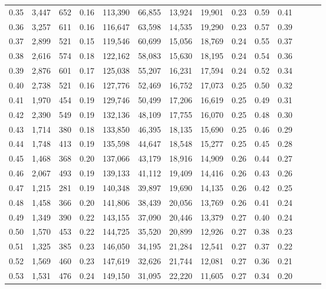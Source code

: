 \begin{tabular}{rrrrrrrrrrrrrr}
0.35 &  3,447 &  652 &  0.16 &  113,390 &   66,855 &  13,924 &  19,901 &  0.23 &  0.59 &      0.41 \\
0.36 &  3,257 &  611 &  0.16 &  116,647 &   63,598 &  14,535 &  19,290 &  0.23 &  0.57 &      0.39 \\
0.37 &  2,899 &  521 &  0.15 &  119,546 &   60,699 &  15,056 &  18,769 &  0.24 &  0.55 &      0.37 \\
0.38 &  2,616 &  574 &  0.18 &  122,162 &   58,083 &  15,630 &  18,195 &  0.24 &  0.54 &      0.36 \\
0.39 &  2,876 &  601 &  0.17 &  125,038 &   55,207 &  16,231 &  17,594 &  0.24 &  0.52 &      0.34 \\
0.40 &  2,738 &  521 &  0.16 &  127,776 &   52,469 &  16,752 &  17,073 &  0.25 &  0.50 &      0.32 \\
0.41 &  1,970 &  454 &  0.19 &  129,746 &   50,499 &  17,206 &  16,619 &  0.25 &  0.49 &      0.31 \\
0.42 &  2,390 &  549 &  0.19 &  132,136 &   48,109 &  17,755 &  16,070 &  0.25 &  0.48 &      0.30 \\
0.43 &  1,714 &  380 &  0.18 &  133,850 &   46,395 &  18,135 &  15,690 &  0.25 &  0.46 &      0.29 \\
0.44 &  1,748 &  413 &  0.19 &  135,598 &   44,647 &  18,548 &  15,277 &  0.25 &  0.45 &      0.28 \\
0.45 &  1,468 &  368 &  0.20 &  137,066 &   43,179 &  18,916 &  14,909 &  0.26 &  0.44 &      0.27 \\
0.46 &  2,067 &  493 &  0.19 &  139,133 &   41,112 &  19,409 &  14,416 &  0.26 &  0.43 &      0.26 \\
0.47 &  1,215 &  281 &  0.19 &  140,348 &   39,897 &  19,690 &  14,135 &  0.26 &  0.42 &      0.25 \\
0.48 &  1,458 &  366 &  0.20 &  141,806 &   38,439 &  20,056 &  13,769 &  0.26 &  0.41 &      0.24 \\
0.49 &  1,349 &  390 &  0.22 &  143,155 &   37,090 &  20,446 &  13,379 &  0.27 &  0.40 &      0.24 \\
0.50 &  1,570 &  453 &  0.22 &  144,725 &   35,520 &  20,899 &  12,926 &  0.27 &  0.38 &      0.23 \\
0.51 &  1,325 &  385 &  0.23 &  146,050 &   34,195 &  21,284 &  12,541 &  0.27 &  0.37 &      0.22 \\
0.52 &  1,569 &  460 &  0.23 &  147,619 &   32,626 &  21,744 &  12,081 &  0.27 &  0.36 &      0.21 \\
0.53 &  1,531 &  476 &  0.24 &  149,150 &   31,095 &  22,220 &  11,605 &  0.27 &  0.34 &      0.20 \\

\end{tabular}
